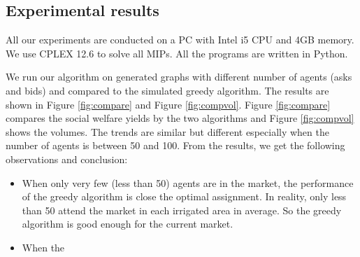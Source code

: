 \documentclass{aamas2015}
\begin{document}
\subsection{Experimental results}

All our experiments are conducted on a PC with Intel i5 CPU and 4GB memory.
We use CPLEX 12.6 to solve all MIPs.
All the programs are written in Python.

We run our algorithm on generated graphs with different number of agents (asks and bids) and compared to the simulated greedy algorithm.
The results are shown in Figure \ref{fig:compare} and Figure \ref{fig:compvol}. Figure \ref{fig:compare} compares the social welfare yields by the two algorithms and Figure \ref{fig:compvol} shows the volumes. The trends are similar but different especially when the number of agents is between 50 and 100.
From the results, we get the following observations and conclusion:

\begin{itemize}
	\item When only very few (less than 50) agents are in the market, the performance of the greedy algorithm is close the optimal assignment. In reality, only less than 50 attend the market in each irrigated area in average. So the greedy algorithm is good enough for the current market.
	\item When the 
\end{itemize}
\end{document}
